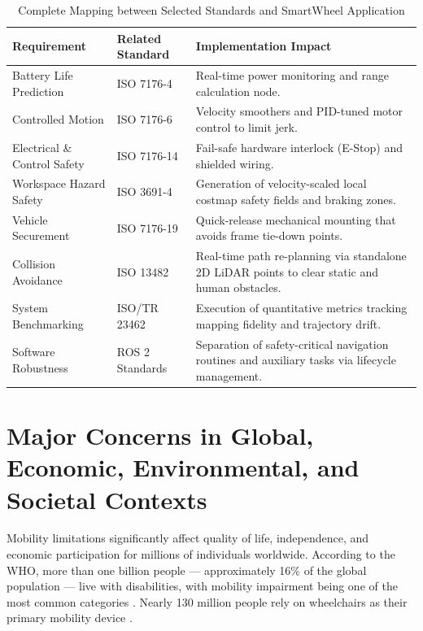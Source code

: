 \documentclass[12pt,a4paper]{report}
\begin{document}
\begin{table}[H]
\centering
\caption{Complete Mapping between Selected Standards and SmartWheel Application}
\label{tab:standards_mapping}
\begin{tabularx}{\textwidth}{@{}p{}p{}X@{}}
\toprule
\textbf{Requirement} & \textbf{Related Standard} & \textbf{Implementation Impact} \\
\midrule
Battery Life Prediction & ISO 7176-4 \cite{iso7176_4} & Real-time power monitoring and range calculation node. \\
\midrule
Controlled Motion & ISO 7176-6 \cite{iso7176_6} & Velocity smoothers and PID-tuned motor control \cite{pid_control} to limit jerk. \\
\midrule
Electrical \& Control Safety & ISO 7176-14 \cite{iso7176_14} & Fail-safe hardware interlock (E-Stop) and shielded wiring. \\
\midrule
Workspace Hazard Safety & ISO 3691-4 \cite{iso3691_4} & Generation of velocity-scaled local costmap safety fields and braking zones. \\
\midrule
Vehicle Securement & ISO 7176-19 \cite{iso7176_19} & Quick-release mechanical mounting that avoids frame tie-down points. \\
\midrule
Collision Avoidance & ISO 13482 \cite{iso13482} & Real-time path re-planning via standalone 2D LiDAR points to clear static and human obstacles. \\
\midrule
System Benchmarking & ISO/TR 23462 \cite{isotr23462} & Execution of quantitative metrics tracking mapping fidelity and trajectory drift. \\
\midrule
Software Robustness & ROS 2 Standards \cite{ros2} & Separation of safety-critical navigation routines and auxiliary tasks via lifecycle management. \\
\bottomrule
\end{tabularx}
\end{table}

\section{Major Concerns in Global, Economic, Environmental, and Societal Contexts}

Mobility limitations significantly affect quality of life, independence, and economic participation for millions of individuals worldwide. According to the WHO, more than one billion people — approximately 16\% of the global population — live with disabilities, with mobility impairment being one of the most common categories \cite{who_disability}.
Nearly 130 million people rely on wheelchairs as their primary mobility device \cite{who_disability}.
\end{document}
